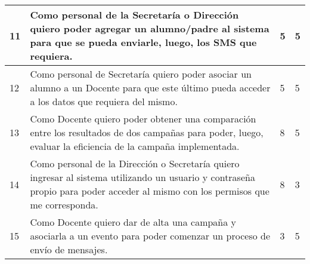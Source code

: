 \documentclass[a4paper, 11pt]{article}
\begin{document}
\begin{table}[H]
\begin{tabular}{ | p{1cm} | p{10cm} | p{1cm} | p{1cm} |}
11 & Como personal de la Secretaría o Dirección quiero poder agregar un alumno/padre al sistema para que se pueda enviarle, luego, los SMS que requiera. & 5 & 5  \\ \hline


12 & Como personal de Secretaría quiero poder asociar un alumno a un Docente para que este último pueda acceder a los datos que requiera del mismo. & 5 & 5\\ \hline


13 & Como Docente quiero poder obtener una comparación entre los resultados de dos campañas para poder, luego, evaluar la eficiencia de la campaña implementada. & 8 & 5\\ \hline


14 & Como personal de la Dirección o Secretaría quiero ingresar al sistema utilizando un usuario y contraseña propio para poder acceder al mismo con los permisos que me corresponda. & 8 & 3 \\ \hline


15 & Como Docente quiero dar de alta una campaña y asociarla a un evento para poder comenzar un proceso de envío de mensajes. & 3 & 5 \\ \hline

\end{tabular}
\end{table}

\newpage
\end{document}
